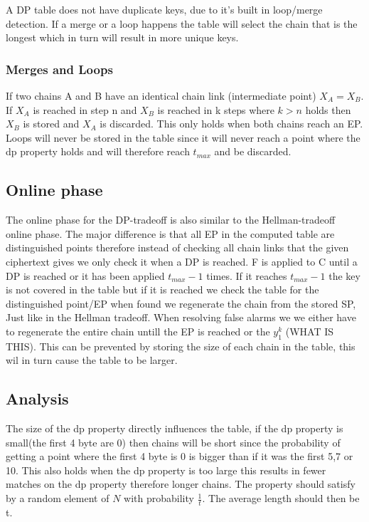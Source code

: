 A DP table does not have duplicate keys, due to it's built in loop/merge detection. If a merge or a loop happens the table will select the chain that is the longest which in turn will result in more unique keys.
\subsubsection{Merges and Loops}
If two chains A and B have an identical chain link (intermediate point) $X_A = X_B$. If $X_A$ is reached in step n and $X_B$ is reached in k steps where $k>n$ holds then $X_B$ is stored and $X_A$ is discarded. This only holds when both chains reach an EP. Loops will never be stored in the table since it will never reach a point where the dp property holds and will therefore reach $t_{max}$ and be discarded.

\subsection{Online phase}
The online phase for the DP-tradeoff is also similar to the Hellman-tradeoff online phase. The major difference is that all EP in the computed table are distinguished points therefore instead of checking all chain links that the given ciphertext gives we only check it when a DP is reached. F is applied to C until a DP is reached or it has been applied $t_{max}-1$ times. If it reaches $t_{max}-1$ the key is not covered in the table but if it is reached we check the table for the distinguished point/EP when found we regenerate the chain from the stored SP, Just like in the Hellman tradeoff. When resolving false alarms we we either have to regenerate the entire chain untill the EP is reached or the $y^k_1$ (WHAT IS THIS). This can be prevented by storing the size of each chain in the table, this wil in turn cause the table to be larger.

\subsection{Analysis}
The size of the dp property directly influences the table, if the dp property is small(the first 4 byte are 0) then chains will be short since the probability of getting a point where the first 4 byte is 0 is bigger than if it was the first 5,7 or 10. This also holds when the dp property is too large this results in fewer matches on the dp property therefore longer chains. The property should satisfy by a random element of $N$ with probability $\frac{1}{t}$. The average length should then be t.

